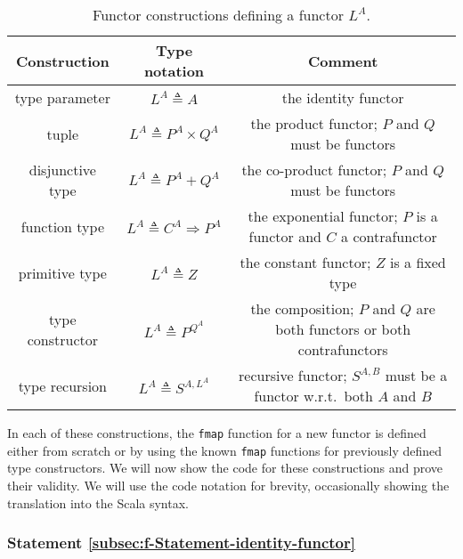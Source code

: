 \begin{table}
\begin{centering}
\begin{tabular}{|c|c|c|}
\hline 
\textbf{\small{}Construction} & \textbf{\small{}Type notation} & \textbf{\small{}Comment}\tabularnewline
\hline 
\hline 
{\footnotesize{}type parameter} & {\footnotesize{}$L^{A}\triangleq A$} & {\footnotesize{}the identity functor}\tabularnewline
\hline 
{\footnotesize{}tuple} & {\footnotesize{}$L^{A}\triangleq P^{A}\times Q^{A}$} & {\footnotesize{}the product functor; $P$ and $Q$ must be functors}\tabularnewline
\hline 
{\footnotesize{}disjunctive type} & {\footnotesize{}$L^{A}\triangleq P^{A}+Q^{A}$} & {\footnotesize{}the co-product functor; $P$ and $Q$ must be functors}\tabularnewline
\hline 
{\footnotesize{}function type} & {\footnotesize{}$L^{A}\triangleq C^{A}\Rightarrow P^{A}$} & {\footnotesize{}the exponential functor; $P$ is a functor and $C$
a contrafunctor}\tabularnewline
\hline 
{\footnotesize{}primitive type} & {\footnotesize{}$L^{A}\triangleq Z$} & {\footnotesize{}the constant functor; $Z$ is a fixed type}\tabularnewline
\hline 
{\footnotesize{}type constructor} & {\footnotesize{}$L^{A}\triangleq P^{Q^{A}}$} & {\footnotesize{}the composition; $P$ and $Q$ are both functors or
both contrafunctors}\tabularnewline
\hline 
{\footnotesize{}type recursion} & {\footnotesize{}$L^{A}\triangleq S^{A,L^{A}}$} & {\footnotesize{}recursive functor; $S^{A,B}$ must be a functor w.r.t.~both
$A$ and $B$}\tabularnewline
\hline 
\end{tabular}
\par\end{centering}
\caption{Functor constructions defining a functor $L^{A}$.\label{tab:f-Functor-constructions}}
\end{table}

In each of these constructions, the \lstinline!fmap! function for
a new functor is defined either from scratch or by using the known
\lstinline!fmap! functions for previously defined type constructors.
We will now show the code for these constructions and prove their
validity. We will use the code notation for brevity, occasionally
showing the translation into the Scala syntax.

\subsubsection{Statement \label{subsec:f-Statement-identity-functor}\ref{subsec:f-Statement-identity-functor}}

